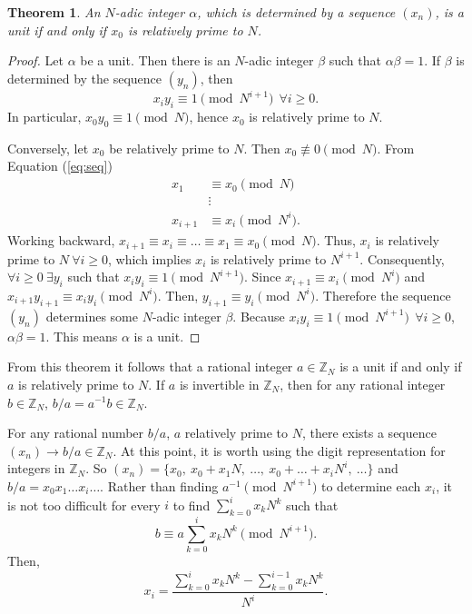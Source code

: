 \documentclass[english]{article}
\def\zzzn{\mathbb{Z}_N}
\def\xn{(x_n)}
\def\yn{(y_n)}
\theoremstyle{plain}
\newtheorem{theorem}{Theorem}[subsection]
\theoremstyle{definition}
\theoremstyle{remark}
\begin{document}
\begin{theorem}\label{thm:units}
  An $N$-adic integer $\alpha$, which is determined by a sequence $\xn$, is
  a unit if and only if $x_0$ is relatively prime to $N$.
\end{theorem}
\begin{proof}
  Let $\alpha$ be a unit. Then there is an $N$-adic integer $\beta$ such
  that $\alpha\beta=1$. If $\beta$ is determined by the sequence $\yn$, then
  \begin{equation}\label{eq:units}
    x_iy_i\equiv1\pmod{N^{i+1}} \ \ \forall i \geq 0.
  \end{equation}
  In particular, $x_0y_0\equiv1\pmod N$, hence $x_0$ is relatively prime to
  $N$. 
  \par Conversely, let $x_0$ be relatively prime to $N$. Then
  $x_0\not\equiv0\pmod{N}$. From Equation (\ref{eq:seq})
  \begin{align*}
    x_1 &\equiv x_0 \pmod N\\
    &\vdots \\
    x_{i+1} &\equiv x_i \pmod{N^i}. 
  \end{align*}
  Working backward, $x_{i+1} \equiv x_i \equiv \dots \equiv x_1 \equiv
  x_0 \pmod N$. Thus, $x_i$ is relatively prime to $N \ \forall i\geq0$,
  which implies $x_i$ is relatively prime to $N^{i+1}$. Consequently,
  $\forall i\geq0 \ \exists y_i$ such that $x_iy_i \equiv 1 \pmod{N^{i+1}}$.
  Since $x_{i+1} \equiv x_i \pmod N^i$ and $x_{i+1}y_{i+1} \equiv
  x_iy_i \pmod{N^i}$. Then, $y_{i+1} \equiv y_i \pmod{N^i}$. Therefore the
  sequence $\yn$ determines some $N$-adic integer $\beta$. Because
  $x_iy_i \equiv 1 \pmod{N^{i+1}} \ \ \forall i \geq 0$, $\alpha\beta=1$.
  This means $\alpha$ is a unit.
\end{proof}

\par From this theorem it follows that a rational integer $a\in\zzzn$ is a
unit if and only if $a$ is relatively prime to $N$. If $a$ is invertible in
$\zzzn$, then for any rational integer $b\in\zzzn$, $b/a=a^{-1}b\in\zzzn$.

\par For any rational number $b/a$, $a$ relatively prime to $N$, there
exists a sequence $\xn \rightarrow b/a \in \zzzn$. At this point, it is
worth using the digit representation for integers in $\zzzn$. So
$\xn=\{x_0, \ x_0+x_1N, \ \dots, \ x_0+\dots+x_iN^i, \ \dots\}$ and
$b/a = x_0x_1\dots x_i\dots$. Rather than finding $a^{-1}\pmod{N^{i+1}}$ to
determine each $x_i$, it is not too difficult for every $i$ to find
$\sum_{k=0}^ix_kN^k$ such that
\begin{equation}\label{eq:seq-rational}
  b \equiv a\sum_{k=0}^ix_kN^k \pmod{N^{i+1}}.
\end{equation}
Then, 
\begin{equation}
  x_i = \frac{\sum_{k=0}^ix_kN^k - \sum_{k=0}^{i-1}x_kN^k}{N^i}.
\end{equation}
\end{document}
